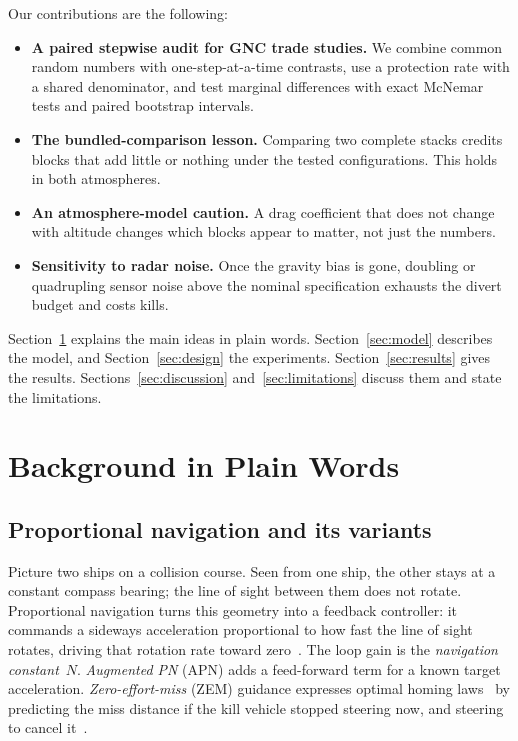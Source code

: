 \documentclass[conference,letterpaper]{IEEEtran}
\begin{document}
Our contributions are the following:
\begin{itemize}
\item \textbf{A paired stepwise audit for GNC trade studies.} We combine common random numbers with one-step-at-a-time contrasts, use a protection rate with a shared denominator, and test marginal differences with exact McNemar tests and paired bootstrap intervals.
\item \textbf{The bundled-comparison lesson.} Comparing two complete stacks credits blocks that add little or nothing under the tested configurations. This holds in both atmospheres.
\item \textbf{An atmosphere-model caution.} A drag coefficient that does not change with altitude changes which blocks appear to matter, not just the numbers.
\item \textbf{Sensitivity to radar noise.} Once the gravity bias is gone, doubling or quadrupling sensor noise above the nominal specification exhausts the divert budget and costs kills.
\end{itemize}

Section~\ref{sec:background} explains the main ideas in plain words.
Section~\ref{sec:model} describes the model, and Section~\ref{sec:design} the experiments.
Section~\ref{sec:results} gives the results.
Sections~\ref{sec:discussion} and~\ref{sec:limitations} discuss them and state the limitations.

\section{Background in Plain Words}
\label{sec:background}

\subsection{Proportional navigation and its variants}

Picture two ships on a collision course.
Seen from one ship, the other stays at a constant compass bearing; the line of sight between them does not rotate.
Proportional navigation turns this geometry into a feedback controller: it commands a sideways acceleration proportional to how fast the line of sight rotates, driving that rotation rate toward zero~\cite{murtaugh1966,shneydor1998,zarchan2012}.
The loop gain is the \emph{navigation constant}~$N$.
\emph{Augmented PN} (APN) adds a feed-forward term for a known target acceleration.
\emph{Zero-effort-miss} (ZEM) guidance expresses optimal homing laws~\cite{cottrell1971,nesline1981} by predicting the miss distance if the kill vehicle stopped steering now, and steering to cancel it~\cite{palumbo2010modern,zarchan2012}.
\end{document}
